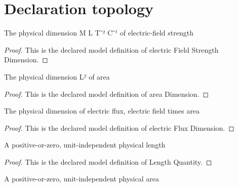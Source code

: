 \section{Declaration topology}
\begin{definition}
  \label{def:physics:phyx-mini-0842:phyxminiproblems-problemphyxmini0842-electricfieldstrengthdimension}
  The physical dimension M L T⁻² C⁻¹ of electric-field strength
\end{definition}
\begin{proof}
  This is the declared model definition of electric Field Strength Dimension.
\end{proof}
\begin{definition}
  \label{def:physics:phyx-mini-0842:phyxminiproblems-problemphyxmini0842-areadimension}
  The physical dimension L² of area
\end{definition}
\begin{proof}
  This is the declared model definition of area Dimension.
\end{proof}
\begin{definition}
  \label{def:physics:phyx-mini-0842:phyxminiproblems-problemphyxmini0842-electricfluxdimension}
  The physical dimension of electric flux, electric field times area
\end{definition}
\begin{proof}
  This is the declared model definition of electric Flux Dimension.
\end{proof}
\begin{definition}
  \label{def:physics:phyx-mini-0842:phyxminiproblems-problemphyxmini0842-lengthquantity}
  A positive-or-zero, unit-independent physical length
\end{definition}
\begin{proof}
  This is the declared model definition of Length Quantity.
\end{proof}
\begin{definition}
  \label{def:physics:phyx-mini-0842:phyxminiproblems-problemphyxmini0842-areaquantity}
  A positive-or-zero, unit-independent physical area
\end{definition}
